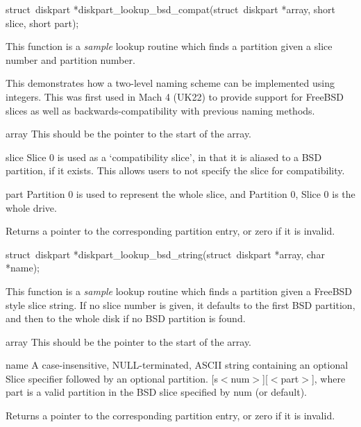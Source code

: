 \begin{apisyn}

        \funcproto struct~diskpart
		*diskpart_lookup_bsd_compat(struct~diskpart *array,
		        short slice, short part);
\end{apisyn}
\begin{apidesc}
	This function is a \emph{sample} lookup routine which finds a partition
	given a slice number and partition number.

	This demonstrates how a two-level naming scheme can be
	implemented using integers.
	This was first used in Mach 4 (UK22) to provide support for
	FreeBSD slices as well as backwards-compatibility with
	previous naming methods.

\end{apidesc}
\begin{apiparm}
        \item[array]
		This should be the pointer to the start of the array.
	\item[slice]
		Slice 0 is used as a `compatibility slice', in that it
		is aliased to a BSD partition, if it exists.  This
		allows users to not specify the slice for compatibility.
	\item[part]
		Partition 0 is used to represent the whole slice, and
		Partition 0, Slice 0 is the whole drive.
\end{apiparm}
\begin{apiret}
        Returns a pointer to the corresponding partition entry, or
	zero if it is invalid.
\end{apiret}


\begin{apisyn}

        \funcproto struct~diskpart
		*diskpart_lookup_bsd_string(struct~diskpart *array, char *name);
\end{apisyn}
\begin{apidesc}
	This function is a \emph{sample} lookup routine which finds a partition
	given a FreeBSD style slice string.  If no slice number is
	given, it defaults to the first BSD partition, and then to the
	whole disk if no BSD partition is found.

\end{apidesc}
\begin{apiparm}
        \item[array]
		This should be the pointer to the start of the array.
	\item[name]
		A case-insensitive, NULL-terminated, ASCII string
		containing an optional Slice specifier followed by an
		optional partition.  [s$<$num$>$][$<$part$>$], where part is
		a valid partition in the BSD slice specified by num
		(or default).
\end{apiparm}
\begin{apiret}
        Returns a pointer to the corresponding partition entry, or
	zero if it is invalid.
\end{apiret}



